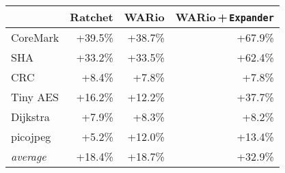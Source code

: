 \begin{tabular}{@{}lrrr@{}}
\toprule
 & \textbf{Ratchet} & \textbf{WARio} & \textbf{WARio\,+\,\texttt{Expander}} \\ \midrule
\textsf{CoreMark} & +39.5\% & +38.7\% & +67.9\% \\
\textsf{SHA} & +33.2\% & +33.5\% & +62.4\% \\
\textsf{CRC} & +8.4\% & +7.8\% & +7.8\% \\
\textsf{Tiny AES} & +16.2\% & +12.2\% & +37.7\% \\
\textsf{Dijkstra} & +7.9\% & +8.3\% & +8.2\% \\
\textsf{picojpeg} & +5.2\% & +12.0\% & +13.4\% \\
 \midrule
\emph{average} & +18.4\% & +18.7\% & +32.9\% \\ \bottomrule
\end{tabular}

